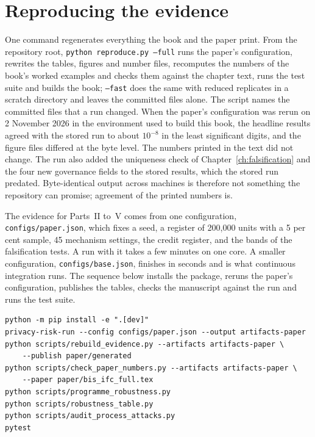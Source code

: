 \section{Reproducing the evidence}

One command regenerates everything the book and the paper print. From the repository
root, \texttt{python reproduce.py --full} runs the paper's configuration, rewrites the
tables, figures and number files, recomputes the numbers of the book's worked examples and
checks them against the chapter text, runs the test suite and builds the book;
\texttt{--fast} does the same with reduced replicates in a scratch directory and leaves the
committed files alone. The script names the committed files that a run changed. When the
paper's configuration was rerun on 2 November 2026 in the environment used to build this
book, the headline results agreed with the stored run to about $10^{-8}$ in the least
significant digits, and the figure files differed at the byte level. The numbers printed in
the text did not change. The run also added the uniqueness check of
Chapter~\ref{ch:falsification} and the four new governance fields to the stored results, which
the stored run predated. Byte-identical output across machines is therefore not something
the repository can promise; agreement of the printed numbers is.

The evidence for Parts~II to~V comes from one configuration, \texttt{configs/\allowbreak{}paper.\allowbreak{}json},
which fixes a seed, a register of 200{,}000 units with a 5 per cent sample, 45
mechanism settings, the credit register, and the bands of the falsification tests.
A run with it takes a few minutes on one core. A smaller configuration,
\texttt{configs/\allowbreak{}base.\allowbreak{}json}, finishes in seconds and is what continuous integration
runs. The sequence below installs the package, reruns the paper's configuration,
publishes the tables, checks the manuscript against the run and runs the test suite.

\begin{lstlisting}[language={}]
python -m pip install -e ".[dev]"
privacy-risk-run --config configs/paper.json --output artifacts-paper
python scripts/rebuild_evidence.py --artifacts artifacts-paper \
    --publish paper/generated
python scripts/check_paper_numbers.py --artifacts artifacts-paper \
    --paper paper/bis_ifc_full.tex
python scripts/programme_robustness.py
python scripts/robustness_table.py
python scripts/audit_process_attacks.py
pytest
\end{lstlisting}


